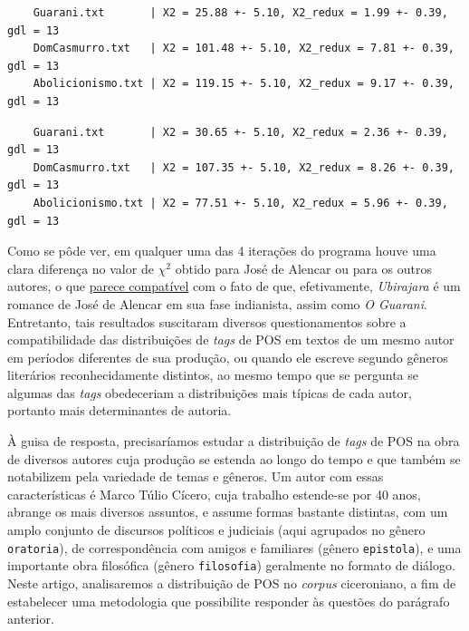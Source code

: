 \documentclass[10pt,a4paper,onecolumn]{article}
\theoremstyle{definition}
\theoremstyle{remark}
\begin{document}
\begin{verbatim}
	Guarani.txt       | X2 = 25.88 +- 5.10, X2_redux = 1.99 +- 0.39, gdl = 13
	DomCasmurro.txt   | X2 = 101.48 +- 5.10, X2_redux = 7.81 +- 0.39, gdl = 13
	Abolicionismo.txt | X2 = 119.15 +- 5.10, X2_redux = 9.17 +- 0.39, gdl = 13
\end{verbatim}

\begin{verbatim}
	Guarani.txt       | X2 = 30.65 +- 5.10, X2_redux = 2.36 +- 0.39, gdl = 13
	DomCasmurro.txt   | X2 = 107.35 +- 5.10, X2_redux = 8.26 +- 0.39, gdl = 13
	Abolicionismo.txt | X2 = 77.51 +- 5.10, X2_redux = 5.96 +- 0.39, gdl = 13
\end{verbatim}

Como se pôde ver, em qualquer uma das 4 iterações do programa houve uma clara diferença no valor de $\chi^2$ obtido para José de Alencar ou para os outros autores, o que \underline{parece compatível} com o fato de que, efetivamente, \emph{Ubirajara} é um romance de José de Alencar em sua fase indianista, assim como \emph{O Guarani}. Entretanto, tais resultados suscitaram diversos questionamentos sobre a compatibilidade das distribuições de \emph{tags} de POS em textos de um mesmo autor em períodos diferentes de sua produção, ou quando ele escreve segundo gêneros literários reconhecidamente distintos, ao mesmo tempo que se pergunta se algumas das \emph{tags} obedeceriam a distribuições mais típicas de cada autor, portanto mais determinantes de autoria.

\break

À guisa de resposta, precisaríamos estudar a distribuição de \emph{tags} de POS na obra de diversos autores cuja produção se estenda ao longo do tempo e que também se notabilizem pela variedade de temas e gêneros. Um autor com essas características é Marco Túlio Cícero, cuja trabalho estende-se por 40 anos, abrange os mais diversos assuntos, e assume formas bastante distintas, com um amplo conjunto de discursos políticos e judiciais (aqui agrupados no gênero \texttt{oratoria}), de correspondência com amigos e familiares (gênero \texttt{epistola}), e uma importante obra filosófica (gênero \texttt{filosofia}) geralmente no formato de diálogo. Neste artigo, analisaremos a distribuição de POS no \emph{corpus} ciceroniano, a fim de estabelecer uma metodologia que possibilite responder às questões do parágrafo anterior.    
\end{document}
